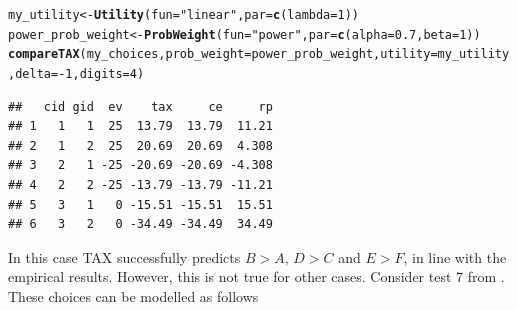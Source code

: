 \documentclass{article}\usepackage[]{graphicx}\usepackage[]{color}
\makeatletter
\newcommand{\hlnum}[1]{\textcolor[rgb]{0.686,0.059,0.569}{#1}}%
\newcommand{\hlstr}[1]{\textcolor[rgb]{0.192,0.494,0.8}{#1}}%
\newcommand{\hlopt}[1]{\textcolor[rgb]{0,0,0}{#1}}%
\newcommand{\hlstd}[1]{\textcolor[rgb]{0.345,0.345,0.345}{#1}}%
\newcommand{\hlkwb}[1]{\textcolor[rgb]{0.69,0.353,0.396}{#1}}%
\newcommand{\hlkwc}[1]{\textcolor[rgb]{0.333,0.667,0.333}{#1}}%
\newcommand{\hlkwd}[1]{\textcolor[rgb]{0.737,0.353,0.396}{\textbf{#1}}}%
\newenvironment{kframe}{%
 \def\at@end@of@kframe{}%
 \ifinner\ifhmode%
  \def\at@end@of@kframe{\end{minipage}}%
  \begin{minipage}{\columnwidth}%
 \fi\fi%
 \def\FrameCommand##1{\hskip\@totalleftmargin \hskip-\fboxsep
 \colorbox{shadecolor}{##1}\hskip-\fboxsep
     \hskip-\linewidth \hskip-\@totalleftmargin \hskip\columnwidth}%
 \MakeFramed {\advance\hsize-\width
   \@totalleftmargin\z@ \linewidth\hsize
   \@setminipage}}%
 {\par\unskip\endMakeFramed%
 \at@end@of@kframe}
\newenvironment{knitrout}{}{} %
\makeatother
\begin{document}
\begin{knitrout}
\color{fgcolor}\begin{kframe}
\begin{alltt}
\hlstd{my_utility} \hlkwb{<-} \hlkwd{Utility}\hlstd{(}\hlkwc{fun}\hlstd{=}\hlstr{"linear"}\hlstd{,} \hlkwc{par}\hlstd{=}\hlkwd{c}\hlstd{(}\hlkwc{lambda}\hlstd{=}\hlnum{1}\hlstd{))}
\hlstd{power_prob_weight} \hlkwb{<-} \hlkwd{ProbWeight}\hlstd{(}\hlkwc{fun}\hlstd{=}\hlstr{"power"}\hlstd{,} \hlkwc{par}\hlstd{=}\hlkwd{c}\hlstd{(}\hlkwc{alpha}\hlstd{=}\hlnum{0.7}\hlstd{,} \hlkwc{beta}\hlstd{=}\hlnum{1}\hlstd{))}
\hlkwd{compareTAX}\hlstd{(my_choices,} \hlkwc{prob_weight}\hlstd{=power_prob_weight,} \hlkwc{utility}\hlstd{=my_utility,} \hlkwc{delta}\hlstd{=}\hlopt{-}\hlnum{1}\hlstd{,} \hlkwc{digits}\hlstd{=}\hlnum{4}\hlstd{)}
\end{alltt}
\begin{verbatim}
##   cid gid  ev    tax     ce     rp
## 1   1   1  25  13.79  13.79  11.21
## 2   1   2  25  20.69  20.69  4.308
## 3   2   1 -25 -20.69 -20.69 -4.308
## 4   2   2 -25 -13.79 -13.79 -11.21
## 5   3   1   0 -15.51 -15.51  15.51
## 6   3   2   0 -34.49 -34.49  34.49
\end{verbatim}
\end{kframe}
\end{knitrout}


In this case TAX successfully predicts $B > A$, $D > C$ and $E > F$, in line with the empirical results.
However, this is not true for other cases.
Consider test 7 from \citet[][Table 1 p. 1326]{Wu_Markle_2008}. These choices can be modelled as follows
\end{document}
